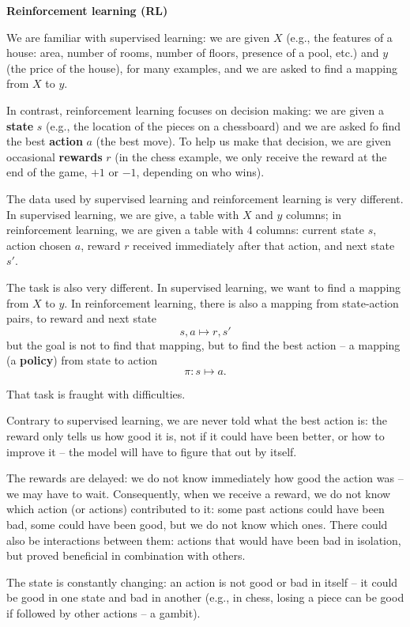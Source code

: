 \documentclass[a5paper]{article}
\let\d\textbf
\def\section#1{\clearpage{\vspace*{0cm}\LARGE\centering\bfseries #1\par\bigskip\bigskip}}
\def\subsection#1{{\par\bigskip\goodbreak\large\bfseries #1\par}}
\begin{document}
\section{Reinforcement learning and bandits}

\subsection{Reinforcement learning (RL)}

We are familiar with supervised learning:
we are given $X$ (e.g., the features of a house:
area, number of rooms, number of floors,
presence of a pool, etc.) and $y$ (the price of the house),
for many examples,
and we are asked to find a mapping from $X$ to $y$.

In contrast, reinforcement learning focuses on decision making:
we are given a \d{state} $s$ (e.g., the location of the pieces on a chessboard)
and we are asked fo find the best \d{action} $a$ (the best move).
To help us make that decision, we are given occasional \d{rewards} $r$
(in the chess example, we only receive the reward at the end of the game, $+1$ or $-1$, depending on who wins).

The data used by supervised learning and reinforcement learning is very different.
In supervised learning, we are give, a table with $X$ and $y$ columns;
in reinforcement learning, we are given a table with 4 columns:
current state $s$, action chosen $a$, reward $r$ received immediately after that action, and next state $s'$.

The task is also very different.
In supervised learning, we want to find a mapping from $X$ to $y$.
In reinforcement learning, there is also a mapping from state-action pairs,
to reward and next state
\[ s, a \longmapsto r, s' \]
but the goal is not to find that mapping,
but to find the best action -- 
a mapping (a \d{policy}) from state to action
\[ \pi: s \longmapsto a. \]

That task is fraught with difficulties.
\begin{compactitem}[--]
\item Contrary to supervised learning, we are never told what the best action is:
the reward only tells us how good it is, not if it could have been better,
or how to improve it -- the model will have to figure that out by itself.
\item The rewards are delayed:
we do not know immediately how good the action was -- we may have to wait.
Consequently, when we receive a reward, we do not know which action (or actions) contributed to it:
some past actions could have been bad, some could have been good, but we do not know which ones.
There could also be interactions between them:
actions that would have been bad in isolation, but proved beneficial in combination with others.
\item The state is constantly changing:
an action is not good or bad in itself --
it could be good in one state and bad in another
(e.g., in chess, losing a piece can be good if followed by other actions -- a gambit).
\end{compactitem}
\end{document}
